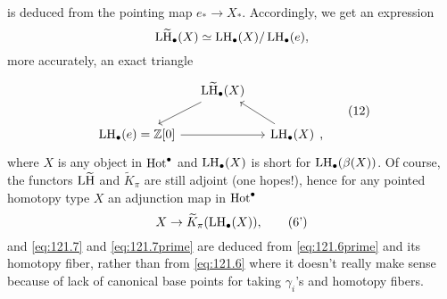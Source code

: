 is deduced from the pointing map $e_*\to X_*$. Accordingly, we get an
expression
\[\operatorname{L\widetilde H}_\bullet(X) \simeq \operatorname{LH}_\bullet(X)/\operatorname{LH}_\bullet(e),\]
more accurately, an exact triangle
\begin{equation}
  \label{eq:121.12}
  \begin{tabular}{@{}c@{}}
    \begin{tikzcd}[baseline=(O.base),column sep=small]
      & \LtH_\bullet(X) \ar[dl] & \\
      \LH_\bullet(e)=\bZ[0] \ar[rr] & &
      |[alias=O]| \LH_\bullet(X)\ar[ul]
    \end{tikzcd},
  \end{tabular}\tag{12}
\end{equation}
where $X$ is any object in $\operatorname{Hot}^\bullet$ and $\operatorname{LH}_\bullet(X)$ is
short for $\operatorname{LH}_\bullet(\beta(X))$. Of course, the functors $\operatorname{L\widetilde H}$ and
$\widetilde K_\pi$ are still adjoint (one hopes!), hence for any pointed
homotopy type $X$ an adjunction map in $\operatorname{Hot}^\bullet$
\begin{equation}
  \label{eq:121.6prime}
  X\to\widetilde K_\pi(\operatorname{LH}_\bullet(X)),\tag{6'}
\end{equation}
and \eqref{eq:121.7} and \eqref{eq:121.7prime} are deduced from
\eqref{eq:121.6prime} and its homotopy fiber, rather than from
\eqref{eq:121.6} where it doesn't really make sense because of lack of
canonical base points for taking $\gamma_i$'s and homotopy fibers.

\bigbreak

\noindent\hfill{}\par

